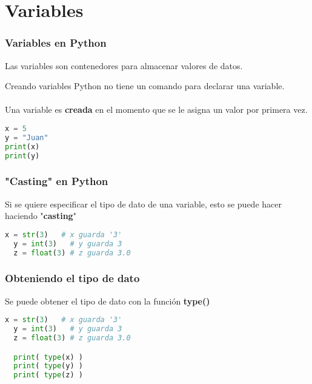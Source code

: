 \section{Variables}

\begin{frame}[fragile]
  \frametitle{Variables en Python}

  Las variables son contenedores para almacenar valores de datos.

  \begin{block}{Creando variables}
    Python no tiene un comando para declarar una variable. \\~\\
    Una variable es \textbf{creada} en el momento que se le asigna un
    valor por primera vez.
  \end{block}

  \begin{lstlisting}[language=Python]
x = 5
y = "Juan"
print(x)
print(y)
  \end{lstlisting}
\end{frame}

\begin{frame}[fragile]
  \frametitle{"Casting" en Python}

  Si se quiere especificar el tipo de dato de una variable, esto se puede hacer
  haciendo "\textbf{casting}"

  \vspace{\baselineskip}
  \begin{lstlisting}[language=Python]
  x = str(3)   # x guarda '3'
  y = int(3)   # y guarda 3
  z = float(3) # z guarda 3.0
  \end{lstlisting}
\end{frame}

\begin{frame}[fragile]
  \frametitle{Obteniendo el tipo de dato}

  Se puede obtener el tipo de dato con la función \textbf{type()}

  \vspace{\baselineskip}
  \begin{lstlisting}[language=Python]
  x = str(3)   # x guarda '3'
  y = int(3)   # y guarda 3
  z = float(3) # z guarda 3.0

  print( type(x) )
  print( type(y) )
  print( type(z) )
  \end{lstlisting}
\end{frame}


